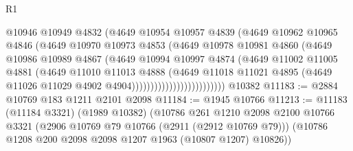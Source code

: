 \begin{lexlean}{R1}
\begin{coremodule}
                                  @10946
                                  @10949
                                  @4832
                                  (@4649
                                    @10954
                                    @10957
                                    @4839
                                    (@4649
                                      @10962
                                      @10965
                                      @4846
                                      (@4649
                                        @10970
                                        @10973
                                        @4853
                                        (@4649
                                          @10978
                                          @10981
                                          @4860
                                          (@4649
                                            @10986
                                            @10989
                                            @4867
                                            (@4649
                                              @10994
                                              @10997
                                              @4874
                                              (@4649
                                                @11002
                                                @11005
                                                @4881
                                                (@4649
                                                  @11010
                                                  @11013
                                                  @4888
                                                  (@4649
                                                    @11018
                                                    @11021
                                                    @4895
                                                    (@4649
                                                      @11026
                                                      @11029
                                                      @4902
                                                      @4904)))))))))))))))))))))))))
    @10382
@11183 := @2884 @10769 @183 @1211 @2101 @2098
@11184 := @1945 @10766
@11213 := @11183
    (@11184 @3321)
    (@1989 @10382)
    (@10786
      @261
      @1210
      @2098
      @2100
      @10766
      @3321
      (@2906 @10769 @79 @10766 (@2911 (@2912 @10769 @79)))
      (@10786 @1208 @200 @2098 @2098 @1207 @1963 (@10807 @1207) @10826))

\end{coremodule}
\end{lexlean}
